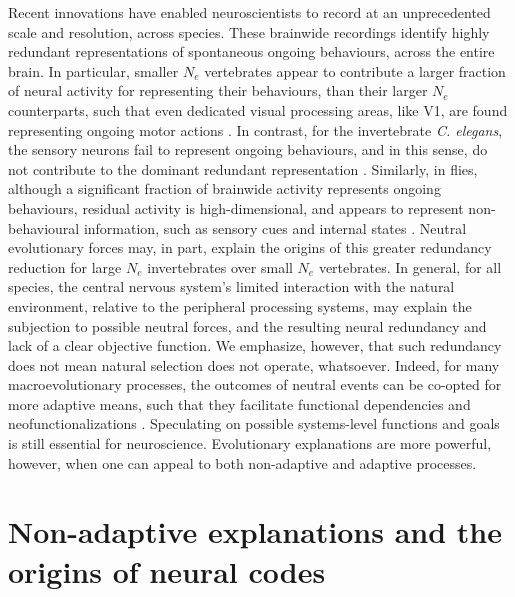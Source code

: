 \documentclass[twocolumn]{article}
\begin{document}
Recent innovations have enabled neuroscientists to record at an unprecedented scale and resolution, across species. These brainwide recordings identify highly redundant representations of spontaneous ongoing behaviours, across the entire brain. In particular, smaller $N_e$ vertebrates appear to contribute a larger fraction of neural activity for representing their behaviours, than their larger $N_e$ counterparts, such that even dedicated visual processing areas, like V1, are found representing ongoing motor actions \cite{stringer_harris_2019, kato_2015, aimon_2019, schaffer_2021, kaplan_zimmer_2020}. In contrast, for the invertebrate \textit{C. elegans}, the sensory neurons fail to represent ongoing behaviours, and in this sense, do not contribute to the dominant redundant representation \cite{kato_2015, kaplan_zimmer_2020}. Similarly, in flies, although a significant fraction of brainwide activity represents ongoing behaviours, residual activity is high-dimensional, and appears to represent non-behavioural information, such as sensory cues and internal states \cite{aimon_2019, schaffer_2021}. Neutral evolutionary forces may, in part, explain the origins of this greater redundancy reduction for large $N_e$ invertebrates over small $N_e$ vertebrates. In general, for all species, the central nervous system's limited interaction with the natural environment, relative to the peripheral processing systems, may explain the subjection to possible neutral forces, and the resulting neural redundancy and lack of a clear objective function. We emphasize, however, that such redundancy does not mean natural selection does not operate, whatsoever. Indeed, for many macroevolutionary processes, the outcomes of neutral events can be co-opted for more adaptive means, such that they facilitate functional dependencies and neofunctionalizations \cite{Lynch_2007, bruckner_2021, kebschull_luo_2020}. Speculating on possible systems-level functions and goals is still essential for neuroscience. Evolutionary explanations are more powerful, however, when one can appeal to both non-adaptive and adaptive processes. 

\section{Non-adaptive explanations and the origins of neural codes}
\end{document}
